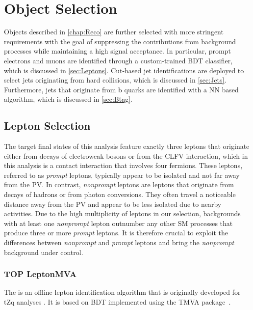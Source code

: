 \chapter{Object Selection}
\label{chap:Objects}

Objects described in \autoref{chap:Reco} are further selected with more stringent requirements with the goal of suppressing the contributions from background processes while maintaining a high signal acceptance. In particular, prompt electrons and muons are identified through a custom-trained \ac{BDT} classifier, which is discussed in \autoref{sec:Leptons}. Cut-based jet identifications are deployed to select jets originating from hard collisions, which is discussed in  \autoref{sec:Jets}. Furthermore, jets that originate from b quarks are identified with a \ac{NN} based algorithm, which is discussed in \autoref{sec:Btag}. 
\section{Lepton Selection}
\label{sec:Leptons}

The target final states of this analysis feature exactly three leptons that originate either from decays of electroweak bosons or from the \ac{CLFV} interaction, which in this analysis is a contact interaction that involves four fermions. These leptons, referred to as \emph{prompt} leptons, typically appear to be isolated and not far away from the \ac{PV}. In contrast, \emph{nonprompt} leptons are leptons that originate from decays of hadrons or from photon conversions. They often travel a noticeable distance away from the \ac{PV} and appear to be less isolated due to nearby activities. Due to the high multiplicity of leptons in our selection, backgrounds with at least one \emph{nonprompt} lepton outnumber any other \ac{SM} processes that produce three or more \emph{prompt} leptons. It is therefore crucial to exploit the differences between \emph{nonprompt} and \emph{prompt} leptons and bring the \emph{nonprompt} background under control. 
\subsection{TOP LeptonMVA}
\label{sec:TOPMVA}

The \TOP is an offline lepton identification algorithm that is originally developed for tZq analyses \cite{CMS:2018sgc,CMS:2021ugv}. It is based on \ac{BDT} implemented using the TMVA package~\cite{TMVA:2007ngy}. 

